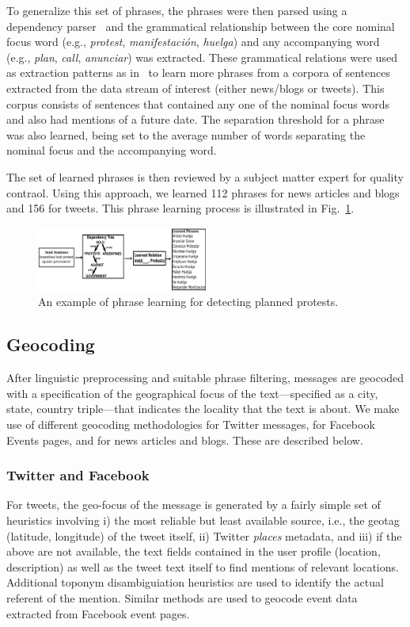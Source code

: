 \documentclass[letterpaper]{article}
\begin{document}
To generalize this set of phrases, the phrases were then parsed
using a dependency parser~\cite{freeling} and the grammatical
relationship between the core nominal focus word (e.g., {\em protest}, 
{\em manifestación}, {\em huelga}) and any accompanying
word (e.g., {\em plan}, {\em call}, {\em anunciar}) was
extracted. These grammatical relations were used as extraction
patterns as in~\cite{riloff2003learning} to learn more phrases from a
corpora of sentences extracted from the data stream of interest
(either news/blogs or tweets). This corpus consists of sentences that
contained any one of the nominal focus words and also had mentions of
a future date. The separation threshold for a phrase was also
learned, being set to the average number of words separating
the nominal focus and the accompanying word.

The set of learned phrases is then reviewed by a subject matter expert for quality contraol.  
Using this approach, we learned 112 phrases for news articles and blogs and 156 for tweets.  
This phrase learning process is illustrated in Fig.~\ref{fig:phraselearning}.

\begin{figure}
\includegraphics[width=0.5\textwidth]{figures/phraseLearning}
\vspace{-2em}
\caption{An example of phrase learning for detecting planned protests.}
\label{fig:phraselearning}
\end{figure}

\subsection{Geocoding}
\label{subsection:geocoding}
After linguistic preprocessing and suitable phrase filtering,
messages are geocoded with a
specification of the geographical focus of the text---specified as a
city, state, country triple---that indicates the locality that the
text is about. We make use of different geocoding methodologies
for Twitter messages, for Facebook Events pages, and for news articles and blogs.
These are described below.

\vspace{-0.5em}
\subsubsection{Twitter and Facebook}
For tweets, the geo-focus of the message is generated by a fairly
simple set of heuristics involving i)
the most reliable but least
available source, i.e., the geotag (latitude, longitude) of the tweet itself,
ii) Twitter {\it places} metadata, and iii) if the above are not
available, the text fields 
contained in
the user profile (location, description) as well as the tweet text
itself to find mentions of relevant locations.  Additional toponym disambiguiation heuristics are used to
identify the actual referent of the mention.
Similar methods are used to geocode event data extracted from 
Facebook event pages.  
\end{document}
